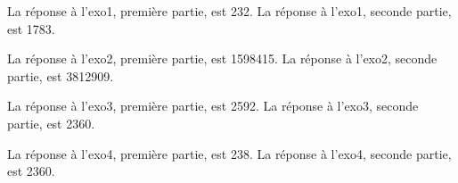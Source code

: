 
La réponse à l'exo1, première partie, est 232.
La réponse à l'exo1, seconde partie, est 1783.

La réponse à l'exo2, première partie, est 1598415.
La réponse à l'exo2, seconde partie, est 3812909.


La réponse à l'exo3, première partie, est 2592.
La réponse à l'exo3, seconde partie, est 2360.


La réponse à l'exo4, première partie, est 238.
La réponse à l'exo4, seconde partie, est 2360.